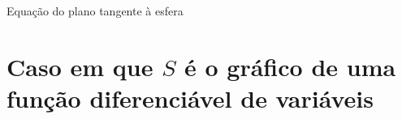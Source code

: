 \begin{example}{Equação do plano tangente à esfera}{}
\begin{center}
\begin{comment}
    
\draw[dashed,gray!50] (0.5,-0.5,0) -- (0.5,-0.5,{2*(0.5)^2});
\draw[dashed,gray!50] (0.5,0,0) -- (0.5,-0.5,0)--(0,-0.5,0);



\draw[red!140,very thick,opacity=0.5] plot[domain=0:sqrt(3)/2,smooth,variable=\t] ({\t},{-0.5},{sqrt(3/4-\t^2)});


\draw[red!140,very thick,opacity=0.5] plot[domain=-1:1,smooth,variable=\t] ({1/2+\t},{-1/2},{sqrt(2)/2-\t*sqrt(2)/2});

\draw[red!20,fill=red!20,opacity=0.5,very thick,opacity=0.5] plot[domain=-1.5:0.5,smooth,variable=\t] ({\t+2},{\t},{0})-- (2.5,0.5,0)-- 
(0,1/2,{5/(2*sqrt(2))}) --(-2,-1.5,{5/(2*sqrt(2))})--cycle ;











\draw[yellow] plot[domain=0:2,smooth,variable=\t] ({1/2+1/2*\t},{-1/2-1/2*\t},{sqrt(2)/2+sqrt(2)/2*\t});

\draw[thick, green!150,-latex,shift={(1/2,-1/2,{sqrt(2)/2})}] (0,0,0)--(1/2,-1/2,{sqrt(2)/2}) node[below left]{\footnotesize$2(x_0,y_0,z_0)$};

\filldraw[red!150] (0.5,-0.5,{sqrt(1-2*(0.5)^2)}) circle (1pt) 
node[left]{\footnotesize$\left(x_0,y_0,z_0\right)$};



	\end{tikzpicture}\end{comment}
\end{center}
\end{example}


\section{Caso em que $S$ é o gráfico de uma função diferenciável de  variáveis}

